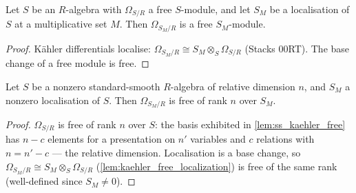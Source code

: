 \begin{lemma}
  \label{lem:kaehler_free_localization}
  \leanok
  Let \(S\) be an \(R\)-algebra with \(\Omega_{S/R}\) a free \(S\)-module, and
  let \(S_M\) be a localisation of \(S\) at a multiplicative set \(M\). Then
  \(\Omega_{S_M/R}\) is a free \(S_M\)-module.
\end{lemma}
\begin{proof}
  \leanok
  K\"ahler differentials localise:
  \(\Omega_{S_M/R} \cong S_M \otimes_S \Omega_{S/R}\) (Stacks 00RT). The base
  change of a free module is free.
\end{proof}

\begin{lemma}
  \label{lem:kaehler_rank_localization}
  \leanok
  Let \(S\) be a nonzero standard-smooth \(R\)-algebra of relative dimension
  \(n\), and \(S_M\) a nonzero localisation of \(S\). Then \(\Omega_{S_M/R}\)
  is free of rank \(n\) over \(S_M\).
\end{lemma}
\begin{proof}
  \leanok
  \(\Omega_{S/R}\) is free of rank \(n\) over \(S\): the basis exhibited in
  \ref{lem:ss_kaehler_free} has \(n - c\) elements for a presentation on \(n'\)
  variables and \(c\) relations with \(n = n' - c\) --- the relative dimension.
  Localisation is a base change, so \(\Omega_{S_M/R} \cong S_M \otimes_S
  \Omega_{S/R}\) (\ref{lem:kaehler_free_localization}) is free of the same rank
  (well-defined since \(S_M \neq 0\)).
\end{proof}

